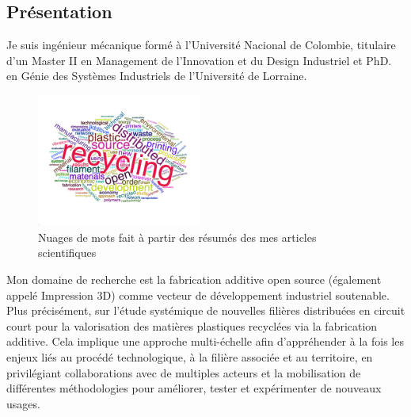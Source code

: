 \documentclass[
  11pt,
]{article}
\begin{document}
\hypertarget{pruxe9sentation}{%
\subsection{Présentation}\label{pruxe9sentation}}

Je suis ingénieur mécanique formé à l'Université Nacional de Colombie,
titulaire d'un Master II en Management de l'Innovation et du Design
Industriel et PhD. en Génie des Systèmes Industriels de l'Université de
Lorraine.

\begin{figure}
  \begin{center}
    \includegraphics[width=0.48\textwidth]{Figures/Cloud.png}
  \end{center}
  \caption{Nuages de mots fait à partir des résumés des mes articles scientifiques}
\end{figure}

Mon domaine de recherche est la fabrication additive open source
(également appelé Impression 3D) comme vecteur de développement
industriel soutenable. Plus précisément, sur l'étude systémique de
nouvelles filières distribuées en circuit court pour la valorisation des
matières plastiques recyclées via la fabrication additive. Cela implique
une approche multi-échelle afin d'appréhender à la fois les enjeux liés
au procédé technologique, à la filière associée et au territoire, en
privilégiant collaborations avec de multiples acteurs et la mobilisation
de différentes méthodologies pour améliorer, tester et expérimenter de
nouveaux usages.
\end{document}
